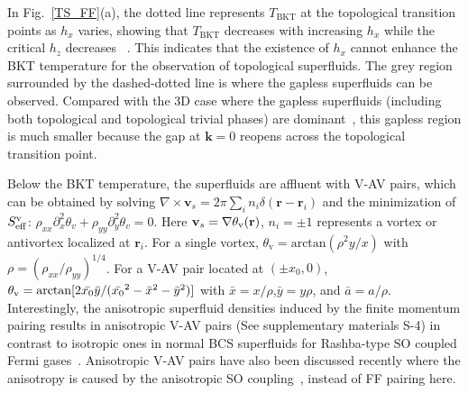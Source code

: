 \documentclass[prl,aps,twocolumn,showpacs, floatfix]{revtex4}
\begin{document}
In Fig.~\ref{TS_FF}(a), the dotted line represents $T_{\mathrm{BKT}}$ at the
topological transition points as $h_{x}$ varies, showing that $T_{\mathrm{BKT%
}}$ decreases with increasing $h_{x}$ while the critical $h_{z}$ decreases~%
\cite{Qu2013NC}. This indicates that the existence of $h_{x}$ cannot enhance
the BKT temperature for the observation of topological superfluids. The grey
region~\cite{Egapless} surrounded by the dashed-dotted line is where the
gapless superfluids can be observed. Compared with the 3D case where the
gapless superfluids (including both topological and topological trivial
phases) are dominant~\cite{Yong2014PRL}, this gapless region is much smaller
because the gap at $\mathbf{k}=0$ reopens across the topological transition
point.

Below the BKT temperature, the superfluids are affluent with V-AV pairs,
which can be obtained by solving $\nabla \times \mathbf{v}_{s}=2\pi
\sum_{i}n_{i}\delta (\mathbf{r}-\mathbf{r}_{i})$ and the minimization of $S_{%
\mathrm{eff}}^{\mathrm{v}}$: $\rho _{xx}\partial _{x}^{2}\theta _{v}+\rho
_{yy}\partial _{y}^{2}\theta _{v}=0$. Here $\mathbf{v}_{s}=\nabla \theta _{%
\mathrm{v}}(\mathbf{r})$, $n_{i}=\pm 1$ represents a vortex or antivortex
localized at $\mathbf{r}_{i}$. For a single vortex, $\theta _{\mathrm{v}}=%
\text{arctan}(\rho ^{2}y/x)$ with $\rho =(\rho _{xx}/\rho _{yy})^{1/4}$. For
a V-AV pair located at $(\pm x_{0},0)$, $\theta _{\mathrm{v}}=\arctan [2\bar{%
x_{0}}\bar{y}/(\bar{x_{0}}^{2}-\bar{x}^{2}-\bar{y}^{2})]$ with $\bar{x}%
=x/\rho $,$\bar{y}=y\rho $, and $\bar{a}=a/\rho $. Interestingly, the
anisotropic superfluid densities induced by the finite momentum pairing
results in anisotropic V-AV pairs (See supplementary materials S-4) in
contrast to isotropic ones in normal BCS superfluids for Rashba-type SO
coupled Fermi gases~\cite{MeloPRL,ZhiDong2012PRL,LianyiHePRL,MingGongPRL}.
Anisotropic V-AV pairs have also been discussed recently where the
anisotropy is caused by the anisotropic SO coupling~\cite{Melo2014arXiv},
instead of FF pairing here.
\end{document}
